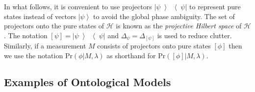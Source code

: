 \documentclass[DIV=calc,paper=a4,fontsize=11pt,twocolumn]{scrartcl} %
\theoremstyle{definition}
\theoremstyle{plain}
\newcommand{\Ket}[1]{\ensuremath{\left \vert #1 \right \rangle}}
\newcommand{\KetBra}[2]{\ensuremath{\left \vert #1 \middle \rangle
\middle \langle #2 \right \vert}}
\newcommand{\Proj}[1]{\ensuremath{\left [ #1 \right ]}}
\begin{document}
In what follows, it is convenient to use projectors
$\KetBra{\psi}{\psi}$ to represent pure states instead of vectors
$\Ket{\psi}$ to avoid the global phase ambiguity.  The set of
projectors onto the pure states of $\mathcal{H}$ is known as the
\emph{projective Hilbert space} of $\mathcal{H}$.  The notation
$\Proj{\psi} = \KetBra{\psi}{\psi}$ and $\Delta_{\psi} =
\Delta_{\Proj{\psi}}$ is used to reduce clutter.  Similarly, if a
measurement $M$ consists of projectors onto pure states $\Proj{\phi}$
then we use the notation $\text{Pr}(\phi|M,\lambda)$ as shorthand for
$\text{Pr}(\Proj{\phi}|M,\lambda)$.

\subsection{Examples of Ontological Models}

\label{EOM}
\end{document}
